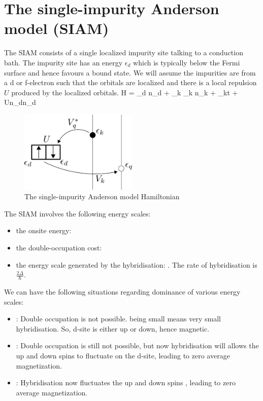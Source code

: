 \documentclass[12pt,twoside]{report}
\numberwithin{equation}{section}
\begin{document}
\section{The single-impurity Anderson model (SIAM)}
The SIAM consists of a single localized impurity site talking to a conduction bath. The impurity site has an energy \(\epsilon_d\) which is typically below the Fermi surface and hence favours a bound state. We will assume the impurities are from a d or f-electron such that the orbitals are localized and there is a local repulsion \(U\) produced by the localized orbitals.
\beq[model]
H = \epsilon_d \hat n_d + \sum_{k} \epsilon_k \hat n_k + \sum_{k\sigma}t + U\hat n_{d\ua}\hat n_{d\da}
\eeq
\begin{figure}[htpb]
	\centering
	\includegraphics[width=0.5\textwidth]{model_scheme.png}
	\caption{The single-impurity Anderson model Hamiltonian}
\end{figure}
The SIAM involves the following energy scales:
\begin{itemize}
    \item the onsite energy: 
    \item the double-occupation cost: 
    \item the energy scale generated by the hybridisation: . The rate of hybridisation is \(\frac{2\Delta}{\hbar}\).
\end{itemize}
We can have the following situations regarding dominance of various energy scales:
\begin{itemize}
    \item {}: Double occupation is not possible.
\il{\Delta} being small means very small hybridisation.
So, d-site is either up or down, hence magnetic.
    \item {}: Double occupation is still not possible, but now hybridisation will allows the up and down spins to fluctuate on the d-site, leading to zero average magnetization.
    \item {}: Hybridisation now fluctuates the up and down spins , leading to zero average magnetization.
\end{itemize}
\end{document}
